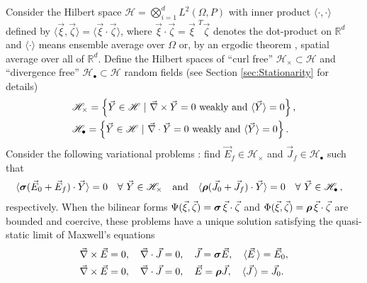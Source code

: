 \documentclass{cmslatex}
\newcommand\bsig{\mbox{\boldmath${\sigma}$}}
\newcommand\brho{\mbox{\boldmath${\rho}$}}
\begin{document}
Consider the Hilbert space $\mathscr{H}=\bigotimes_{i=1}^dL^2(\Omega,P)$ with inner
product $\langle\cdot,\cdot\rangle$ defined by $\langle\vec{\xi},\vec{\zeta}\rangle=\langle\vec{\xi}\cdot\vec{\zeta}\rangle$,
where $\vec{\xi}\cdot\vec{\zeta}=\vec{\xi}^{\;\,T}\vec{\zeta}$ denotes the dot-product
on $\mathbb{R}^d$ and $\langle\cdot\rangle$ means ensemble average over $\Omega$ or, by an
ergodic theorem \cite{Golden:CMP-473}, spatial average over all of
${\mathbb{R}}^d$. Define the Hilbert spaces \cite{Golden:CMP-473} of
``curl free'' $\mathscr{H}_\times\subset\mathscr{H}$ and ``divergence free''
$\mathscr{H}_{\bullet}\subset\mathscr{H}$ random fields (see Section
\ref{sec:Stationarity} for details)     
%
\begin{align}\label{eq:curlfreeHilbert}
  &\mathscr{H}_\times=
  \left\{\vec{Y}\in \mathscr{H} \ | \ \vec{\nabla} \times\vec{Y}=0 \text{ weakly and }
    \langle\vec{Y}\rangle=0
  \right\}, \\
&\mathscr{H}_{\bullet}=
\left\{\vec{Y}\in \mathscr{H} \ | \ \vec{\nabla}\cdot\vec{Y}=0 \text{ weakly and }
    \langle\vec{Y}\rangle=0\right\}.\notag 
\end{align}
%
Consider the following variational problems 
\cite{Golden:CMP-473}: find $\vec{E}_f\in\mathscr{H}_\times$ and
$\vec{J}_f\in\mathscr{H}_\bullet$ such that     
%
\begin{align}
 \label{eq:Weak_Curl_Free_Variational_Form}
 &\langle\bsig(\vec{E}_0+\vec{E}_f)\cdot\vec{Y}\rangle=0 \quad  \forall \
  \vec{Y}\in\mathscr{H}_\times &&\text{and}
%
 &&\langle\brho(\vec{J}_0+\vec{J}_f)\cdot\vec{Y}\rangle=0 \quad  \forall \
  \vec{Y}\in\mathscr{H}_{\bullet}\,,  
\end{align}
%
respectively. When the bilinear forms
$\Psi(\vec{\xi},\vec{\zeta})=\bsig\,\vec{\xi}\cdot\vec{\zeta}$ and
$\Phi(\vec{\xi},\vec{\zeta})=\brho\,\vec{\xi}\cdot\vec{\zeta}$ are bounded and coercive,
these problems have a unique solution
\cite{Golden:CMP-473,Papanicolaou:RF-835} satisfying the quasi-static
limit of Maxwell's equations \cite{Jackson-1999}  
%
\begin{align}   \label{eq:Maxwells_Equations_E}  
 &\vec{\nabla}\times\vec{E}=0, \quad
  \vec{\nabla}\cdot\vec{J}=0,\quad
  \vec{J}=\bsig\vec{E},\quad
  \langle\vec{E}\,\rangle=\vec{E}_0, \\
%
   &\vec{\nabla}\times\vec{E}=0, \quad
   \vec{\nabla}\cdot\vec{J}=0, \quad
   \vec{E}=\brho\vec{J},\quad
   \langle\vec{J}\,\rangle=\vec{J}_0.
   \notag  
\end{align}
\end{document}
